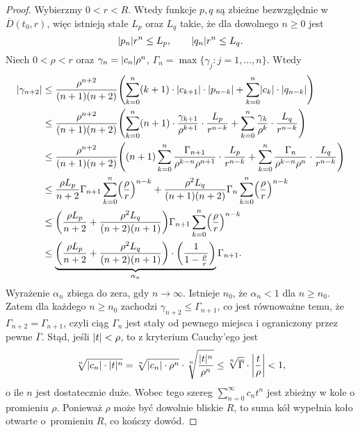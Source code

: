 \begin{proof}
  Wybierzmy $0 < r < R$. Wtedy funkcje $p,q$ są zbieżne bezwzględnie w $\overline{D} (t_0,r)$, więc istnieją stałe 
  $L_p$ oraz $L_q$ takie, że dla dowolnego $n \geq 0$ jest
%
  \begin{equation*}
    \abs{p_n} r^n \leq L_p, \qquad \abs{q_n} r^n \leq L_q.
  \end{equation*}
%
  Niech $0 < \rho < r$ oraz $\gamma_n = \abs{c_n} \rho^n$, $\Gamma_n = \max\{\gamma_j: j = 1,\ldots,n\}$. Wtedy
%
  \begin{align*}
    \abs{\gamma_{n+2}}
    &\leq \frac{\rho^{n+2}}{(n+1)(n+2)} \p*{ \sum_{k = 0}^{n} (k + 1) \cdot \abs{c_{k + 1}} \cdot \abs{p_{n - k}} + 
        \sum_{k = 0}^{n} \abs{c_k} \cdot \abs{q_{n - k}}} \\ 
    &\leq \frac{\rho^{n+2}}{(n+1)(n+2)} \p*{ \sum_{k=0}^{n} (n+1) \cdot \frac{\gamma_{k+1}}{\rho^{k+1}} 
        \cdot \frac{L_p}{r^{n-k}} + \sum_{k=0}^{n} \frac{\gamma_k}{\rho^k} \cdot \frac{L_q}{r^{n-k}} } \\ 
    &\leq \frac{\rho^{n+2}}{(n+1)(n+2)} \p*{ (n+1) \sum_{k=0}^{n} \frac{\Gamma_{n+1}}{\rho^{k-n} \rho^{n+1}} \cdot 
        \frac{L_p}{r^{n-k}} + \sum_{k=0}^{n} \frac{\Gamma_n}{\rho^{k-n}\rho^{n}} \cdot \frac{L_q}{r^{n-k}} } \\
    &\leq \frac{\rho L_p}{n+2} \Gamma_{n+1} \sum_{k=0}^{n} \p*{ \frac{\rho}{r} }^{n-k} +
        \frac{\rho^2 L_q}{(n+1)(n+2)} \Gamma_n \sum_{k=0}^{n} \p*{ \frac{\rho}{r} }^{n-k} \\
    &\leq \p*{ \frac{\rho L_p}{n+2} + \frac{\rho^2 L_q}{(n+2)(n+1)}} \Gamma_{n+1}
        \sum_{k=0}^n \p*{ \frac{\rho}{r} }^{n-k} \\
    &\leq \underbrace{\p*{ \frac{\rho L_p}{n+2} + \frac{\rho^2 L_q}{(n+2)(n+1)}} \cdot
        \p*{\frac{1}{1 - \frac{\rho}{r}}}}_{\alpha_n} \Gamma_{n+1}.
  \end{align*}
%
  Wyrażenie $\alpha_n$ zbiega do zera, gdy $n \to \infty$. Istnieje $n_0$, że $\alpha_n < 1$ dla $n \geq n_0$. Zatem 
  dla każdego $n \geq n_0$ zachodzi $\gamma_{n+2} \leq \Gamma_{n+1}$, co jest równoważne temu, że
  $\Gamma_{n+2} = \Gamma_{n+1}$, czyli ciąg $\Gamma_n$ jest stały od pewnego miejsca i ograniczony przez pewne 
  $\overline{\Gamma}$. Stąd, jeśli $\abs{t} < \rho$, to z kryterium Cauchy'ego jest
%
  \begin{equation*}
    \sqrt[n]{\abs{c_n} \cdot \abs{t}^n} = \sqrt[n]{\abs{c_n} \cdot \rho^n} \cdot 
    \sqrt[n]{\frac{\abs{t}^n}{\rho^n}} \leq \sqrt[n]{\overline{\Gamma}} \cdot \abs*{\frac{t}{\rho}} < 1,
  \end{equation*}
%
  o ile $n$ jest dostatecznie duże. Wobec tego szereg $\sum_{n=0}^{\infty} c_n t^n$ jest zbieżny w kole o promieniu 
  $\rho$. Ponieważ $\rho$ może być dowolnie bliskie $R$, to suma kół wypełnia koło otwarte o~promieniu $R$, co kończy 
  dowód.
\end{proof}

































